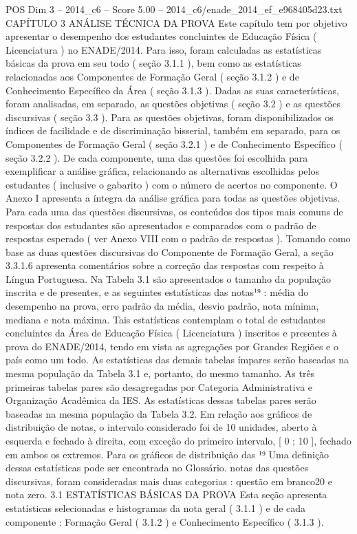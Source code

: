 \begin{textsample}{POS Dim 3 – 2014\_c6 – Score 5.00 – 2014\_c6/enade\_2014\_ef\_e968405d23.txt}  \label{ex:f3_pos_036}
CAPÍTULO 3 ANÁLISE TÉCNICA DA PROVA Este capítulo tem por objetivo apresentar o desempenho dos estudantes concluintes de Educação Física ( Licenciatura ) no ENADE/2014.
Para isso, foram calculadas as estatísticas básicas da prova em seu todo ( seção 3.1.1 ), bem como as estatísticas relacionadas aos Componentes de Formação Geral ( seção 3.1.2 ) e de Conhecimento Específico da Área ( seção 3.1.3 ).
Dadas as suas características, foram analisadas, em separado, as questões objetivas ( seção 3.2 ) e as questões discursivas ( seção 3.3 ).
Para as questões objetivas, foram disponibilizados os índices de facilidade e de discriminação bisserial, também em separado, para os Componentes de Formação Geral ( seção 3.2.1 ) e de Conhecimento Específico ( seção 3.2.2 ).
De cada componente, uma das questões foi escolhida para exemplificar a análise gráfica, relacionando as alternativas escolhidas pelos estudantes ( inclusive o gabarito ) com o número de acertos no componente.
O Anexo I apresenta a íntegra da análise gráfica para todas as questões objetivas.
Para cada uma das questões discursivas, os conteúdos dos tipos mais comuns de respostas dos estudantes são apresentados e comparados com o padrão de respostas esperado ( ver Anexo VIII com o padrão de respostas ).
Tomando como base as duas questões discursivas do Componente de Formação Geral, a seção 3.3.1.6 apresenta comentários sobre a correção das respostas com respeito à Língua Portuguesa.
Na Tabela 3.1 são apresentados o tamanho da população inscrita e de presentes, e as seguintes estatísticas das notas¹⁹ : média do desempenho na prova, erro padrão da média, desvio padrão, nota mínima, mediana e nota máxima.
Tais estatísticas contemplam o total de estudantes concluintes da Área de Educação Física ( Licenciatura ) inscritos e presentes à prova do ENADE/2014, tendo em vista as agregações por Grandes Regiões e o país como um todo.
As estatísticas das demais tabelas ímpares serão baseadas na mesma população da Tabela 3.1 e, portanto, do mesmo tamanho.
As três primeiras tabelas pares são desagregadas por Categoria Administrativa e Organização Acadêmica da IES.
As estatísticas dessas tabelas pares serão baseadas na mesma população da Tabela 3.2.
Em relação aos gráficos de distribuição de notas, o intervalo considerado foi de 10 unidades, aberto à esquerda e fechado à direita, com exceção do primeiro intervalo, [ 0 ; 10 ], fechado em ambos os extremos.
Para os gráficos de distribuição das ¹⁹ Uma definição dessas estatísticas pode ser encontrada no Glossário. notas das questões discursivas, foram consideradas mais duas categorias : questão em branco20 e nota zero. 3.1 ESTATÍSTICAS BÁSICAS DA PROVA Esta seção apresenta estatísticas selecionadas e histogramas da nota geral ( 3.1.1 ) e de cada componente : Formação Geral ( 3.1.2 ) e Conhecimento Específico ( 3.1.3 ).

\end{textsample}

